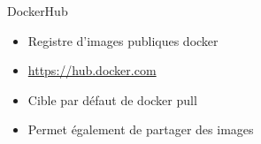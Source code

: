 \begin{frame}{DockerHub}
    \begin{itemize}
        \item Registre d'images publiques docker
        \item \href{https://hub.docker.com}{https://hub.docker.com}
        \item Cible par défaut de docker pull
        \item Permet également de partager des images
    \end{itemize}
\end{frame}